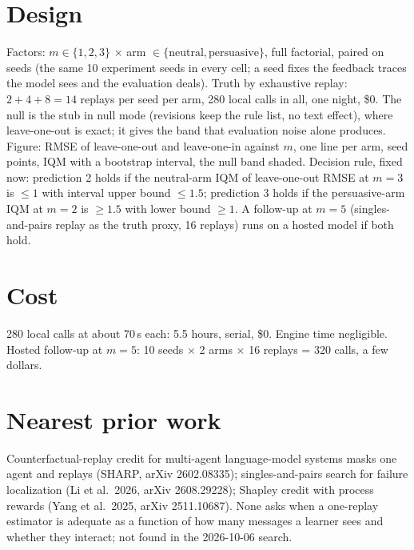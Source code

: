 \documentclass[11pt]{article}
\begin{document}
\section{Design}
Factors: $m\in\{1,2,3\}$ $\times$ arm $\in\{\text{neutral},\text{persuasive}\}$, full factorial, paired on
seeds (the same 10 experiment seeds in every cell; a seed fixes the feedback traces the model sees and the
evaluation deals). Truth by exhaustive replay: $2+4+8=14$ replays per seed per arm, 280 local calls in all,
one night, \$0. The null is the stub in null mode (revisions keep the rule list, no text effect), where
leave-one-out is exact; it gives the band that evaluation noise alone produces. Figure: RMSE of leave-one-out
and leave-one-in against $m$, one line per arm, seed points, IQM with a bootstrap interval, the null band
shaded. Decision rule, fixed now: prediction 2 holds if the neutral-arm IQM of leave-one-out RMSE at $m=3$ is
$\le 1$ with interval upper bound $\le 1.5$; prediction 3 holds if the persuasive-arm IQM at $m=2$ is $\ge 1.5$
with lower bound $\ge 1$. A follow-up at $m=5$ (singles-and-pairs replay as the truth proxy, 16 replays) runs on
a hosted model if both hold.

\section{Cost}
280 local calls at about 70\,s each: 5.5 hours, serial, \$0. Engine time negligible. Hosted follow-up at
$m=5$: 10 seeds $\times$ 2 arms $\times$ 16 replays = 320 calls, a few dollars.

\section{Nearest prior work}
Counterfactual-replay credit for multi-agent language-model systems masks one agent and replays (SHARP,
arXiv 2602.08335); singles-and-pairs search for failure localization (Li et al.\ 2026, arXiv 2608.29228);
Shapley credit with process rewards (Yang et al.\ 2025, arXiv 2511.10687). None asks when a one-replay
estimator is adequate as a function of how many messages a learner sees and whether they interact; not found in
the 2026-10-06 search.
\end{document}
